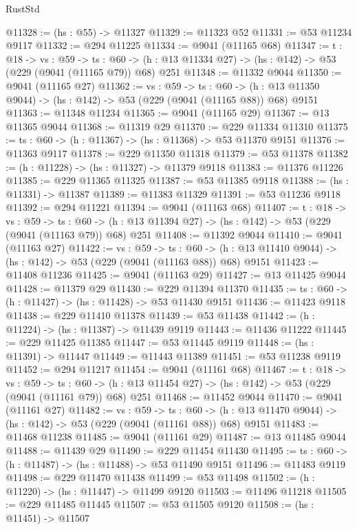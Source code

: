 \begin{lexlean}{RustStd}
\begin{coremodule}
@11328 := (hs : @55) -> @11327
@11329 := @11323 @52
@11331 := @53 @11234 @9117
@11332 := @294 @11225
@11334 := @9041 (@11165 @68)
@11347 := {t : @18} ->
  {vs : @59} ->
  {ts : @60} -> (h : @13 @11334 @27) -> (hs : @142) -> @53 (@229 (@9041 (@11165 @79)) @68) @251
@11348 := @11332 @9044
@11350 := @9041 (@11165 @27)
@11362 := {vs : @59} ->
  {ts : @60} -> (h : @13 @11350 @9044) -> (hs : @142) -> @53 (@229 (@9041 (@11165 @88)) @68) @9151
@11363 := @11348 @11234
@11365 := @9041 (@11165 @29)
@11367 := @13 @11365 @9044
@11368 := @11319 @29
@11370 := @229 @11334 @11310
@11375 := {ts : @60} -> (h : @11367) -> (hs : @11368) -> @53 @11370 @9151
@11376 := @11363 @9117
@11378 := @229 @11350 @11318
@11379 := @53 @11378
@11382 := (h : @11228) -> (hs : @11327) -> @11379 @9118
@11383 := @11376 @11226
@11385 := @229 @11365 @11325
@11387 := @53 @11385 @9118
@11388 := (hs : @11331) -> @11387
@11389 := @11383 @11329
@11391 := @53 @11236 @9118
@11392 := @294 @11221
@11394 := @9041 (@11163 @68)
@11407 := {t : @18} ->
  {vs : @59} ->
  {ts : @60} -> (h : @13 @11394 @27) -> (hs : @142) -> @53 (@229 (@9041 (@11163 @79)) @68) @251
@11408 := @11392 @9044
@11410 := @9041 (@11163 @27)
@11422 := {vs : @59} ->
  {ts : @60} -> (h : @13 @11410 @9044) -> (hs : @142) -> @53 (@229 (@9041 (@11163 @88)) @68) @9151
@11423 := @11408 @11236
@11425 := @9041 (@11163 @29)
@11427 := @13 @11425 @9044
@11428 := @11379 @29
@11430 := @229 @11394 @11370
@11435 := {ts : @60} -> (h : @11427) -> (hs : @11428) -> @53 @11430 @9151
@11436 := @11423 @9118
@11438 := @229 @11410 @11378
@11439 := @53 @11438
@11442 := (h : @11224) -> (hs : @11387) -> @11439 @9119
@11443 := @11436 @11222
@11445 := @229 @11425 @11385
@11447 := @53 @11445 @9119
@11448 := (hs : @11391) -> @11447
@11449 := @11443 @11389
@11451 := @53 @11238 @9119
@11452 := @294 @11217
@11454 := @9041 (@11161 @68)
@11467 := {t : @18} ->
  {vs : @59} ->
  {ts : @60} -> (h : @13 @11454 @27) -> (hs : @142) -> @53 (@229 (@9041 (@11161 @79)) @68) @251
@11468 := @11452 @9044
@11470 := @9041 (@11161 @27)
@11482 := {vs : @59} ->
  {ts : @60} -> (h : @13 @11470 @9044) -> (hs : @142) -> @53 (@229 (@9041 (@11161 @88)) @68) @9151
@11483 := @11468 @11238
@11485 := @9041 (@11161 @29)
@11487 := @13 @11485 @9044
@11488 := @11439 @29
@11490 := @229 @11454 @11430
@11495 := {ts : @60} -> (h : @11487) -> (hs : @11488) -> @53 @11490 @9151
@11496 := @11483 @9119
@11498 := @229 @11470 @11438
@11499 := @53 @11498
@11502 := (h : @11220) -> (hs : @11447) -> @11499 @9120
@11503 := @11496 @11218
@11505 := @229 @11485 @11445
@11507 := @53 @11505 @9120
@11508 := (hs : @11451) -> @11507

\end{coremodule}
\end{lexlean}
